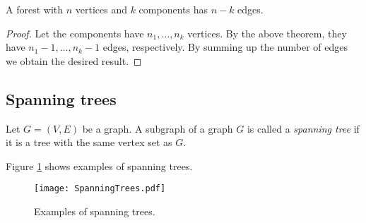 \begin{page}

\begin{cor}
\label{cor:ForestEdges}
A forest with $n$ vertices and $k$ components has $n-k$ edges.
\end{cor}

\end{page}

\begin{page}

\begin{proof}
Let the components have $n_1, \ldots, n_k$ vertices.
By the above theorem, they have $n_1 - 1, \ldots, n_k - 1$ edges, respectively.
By summing up the number of edges we obtain the desired result.
\end{proof}




\end{page}

\begin{page}

\subsection{Spanning trees}

\end{page}

\begin{page}

\begin{dfn}
Let $G = (V, E)$ be a graph.
A subgraph of a graph $G$ is called a \emph{spanning tree} if it is a tree with the same vertex set as $G$.
\end{dfn}

\end{page}

\begin{page}


Figure \ref{fig:SpanningTrees} shows examples of spanning trees.

\begin{figure}[ht]
\begin{center}
\texttt{[image: SpanningTrees.pdf]}
\end{center}
\caption{Examples of spanning trees.}
\label{fig:SpanningTrees}
\end{figure}


\end{page}

